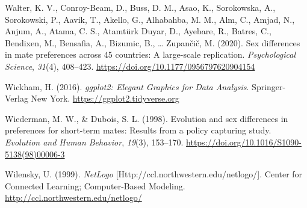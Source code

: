 \documentclass[
  11pt,
]{article}
\newlength{\cslhangindent}
\newlength{\cslentryspacingunit} %
\newenvironment{CSLReferences}[2] %
 {%
  \setlength{\parindent}{0pt}
  \ifodd #1
  \let\oldpar\par
  \def\par{\hangindent=\cslhangindent\oldpar}
  \fi
  \setlength{\parskip}{#2\cslentryspacingunit}
 }%
 {}
\begin{document}
\begin{CSLReferences}{1}{0}
\leavevmode{}%
Walter, K. V., Conroy-Beam, D., Buss, D. M., Asao, K., Sorokowska, A.,
Sorokowski, P., Aavik, T., Akello, G., Alhabahba, M. M., Alm, C., Amjad,
N., Anjum, A., Atama, C. S., Atamtürk Duyar, D., Ayebare, R., Batres,
C., Bendixen, M., Bensafia, A., Bizumic, B., \ldots{} Zupančič, M.
(2020). Sex differences in mate preferences across 45 countries: A
large-scale replication. \emph{Psychological Science}, \emph{31}(4),
408--423. \url{https://doi.org/10.1177/0956797620904154}

\leavevmode{}%
Wickham, H. (2016). \emph{{ggplot2: Elegant Graphics for Data
Analysis}}. Springer-Verlag New York.
\url{https://ggplot2.tidyverse.org}

\leavevmode{}%
Wiederman, M. W., \& Dubois, S. L. (1998). Evolution and sex differences
in preferences for short-term mates: Results from a policy capturing
study. \emph{Evolution and Human Behavior}, \emph{19}(3), 153--170.
\url{https://doi.org/10.1016/S1090-5138(98)00006-3}

\leavevmode{}%
Wilensky, U. (1999). \emph{NetLogo}
{[}Http://ccl.northwestern.edu/netlogo/{]}. Center for Connected
Learning; Computer-Based Modeling.
\url{http://ccl.northwestern.edu/netlogo/}

\end{CSLReferences}
\end{document}
